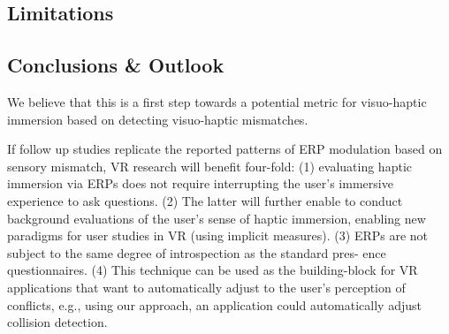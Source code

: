\subsection{Limitations}


\subsection{Conclusions \& Outlook}
We believe that this is a first step towards a potential metric for visuo-haptic immersion based on detecting visuo-haptic mismatches. 

If follow up studies replicate the reported patterns of ERP modulation based on sensory mismatch, VR research will benefit four-fold: (1) evaluating haptic immersion via ERPs does not require interrupting the user’s immersive experience to ask questions. (2) The latter will further enable to conduct background evaluations of the user’s sense of haptic immersion, enabling new paradigms for user studies in VR (using implicit measures). (3) ERPs are not subject to the same degree of introspection as the standard pres- ence questionnaires. (4) This technique can be used as the building-block for VR applications that want to automatically adjust to the user’s perception of conflicts, e.g., using our approach, an application could automatically adjust collision detection.



